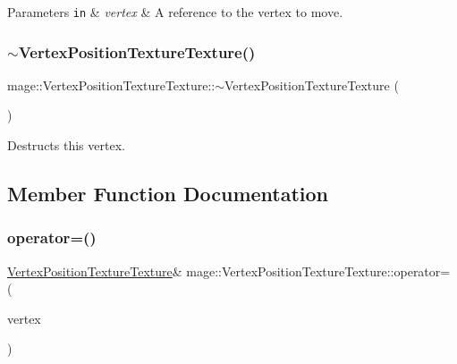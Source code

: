 \begin{DoxyParams}[1]{Parameters}
\mbox{\tt in}  & {\em vertex} & A reference to the vertex to move. \\
\hline
\end{DoxyParams}
\hypertarget{structmage_1_1_vertex_position_texture_texture_a861ed56f084a3385429eae5783178529}{}\label{structmage_1_1_vertex_position_texture_texture_a861ed56f084a3385429eae5783178529} 
\subsubsection{\texorpdfstring{$\sim$\+Vertex\+Position\+Texture\+Texture()}{~VertexPositionTextureTexture()}}
{\footnotesize\ttfamily mage\+::\+Vertex\+Position\+Texture\+Texture\+::$\sim$\+Vertex\+Position\+Texture\+Texture (\begin{DoxyParamCaption}{ }\end{DoxyParamCaption})\hspace{0.3cm}{\ttfamily [default]}}

Destructs this vertex. 

\subsection{Member Function Documentation}
\hypertarget{structmage_1_1_vertex_position_texture_texture_a6880fca48f99b6a3360a41f05ca7f9fc}{}\label{structmage_1_1_vertex_position_texture_texture_a6880fca48f99b6a3360a41f05ca7f9fc} 
\subsubsection{\texorpdfstring{operator=()}{operator=()}\hspace{0.1cm}{\footnotesize\ttfamily [1/2]}}
{\footnotesize\ttfamily \hyperlink{structmage_1_1_vertex_position_texture_texture}{Vertex\+Position\+Texture\+Texture}\& mage\+::\+Vertex\+Position\+Texture\+Texture\+::operator= (\begin{DoxyParamCaption}\item[{const \hyperlink{structmage_1_1_vertex_position_texture_texture}{Vertex\+Position\+Texture\+Texture} \&}]{vertex }\end{DoxyParamCaption})\hspace{0.3cm}{\ttfamily [default]}}

